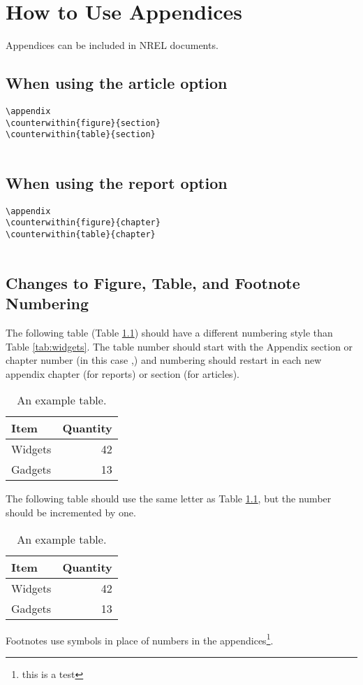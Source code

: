 \chapter{How to Use Appendices}
Appendices can be included in NREL documents.

\section{When using the article option}
\begin{lstlisting}
\appendix
\counterwithin{figure}{section}
\counterwithin{table}{section}


\end{lstlisting}

\section{When using the report option}
\begin{lstlisting}
\appendix
\counterwithin{figure}{chapter}
\counterwithin{table}{chapter}


\end{lstlisting}

\section{Changes to Figure, Table, and Footnote Numbering}
The following table (Table \ref{tab:AppAWidgets}) should have a different numbering style than Table \ref{tab:widgets}. The table number should start with the Appendix section or chapter number (in this case \thechapter,) and numbering should restart in each new appendix chapter (for reports) or section (for articles).

\begin{table}[!h]
\centering
\caption{An example table.}\label{tab:AppAWidgets}
\begin{tabular}{lr}
Item & Quantity \\
\hline
Widgets & 42 \\
Gadgets & 13
\end{tabular}
\end{table}

The following table should use the same letter as Table \ref{tab:AppAWidgets}, but the number should be incremented by one.

\begin{table}[!h]
\centering
\caption{An example table.}\label{tab:AppAWidgetsTwo}
\begin{tabular}{lr}
Item & Quantity \\
\hline
Widgets & 42 \\
Gadgets & 13
\end{tabular}
\end{table}

Footnotes use symbols in place of numbers in the appendices\footnote{this is a test}.